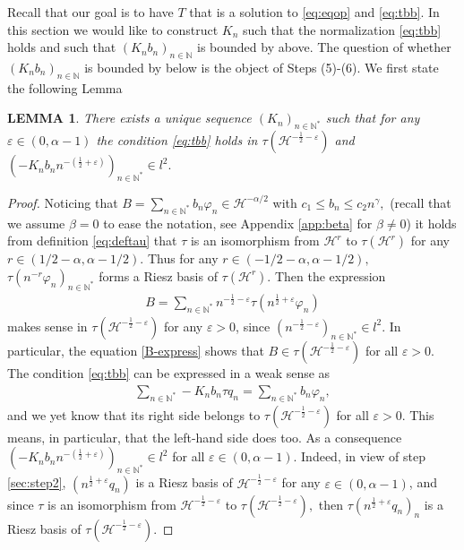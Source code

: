 \documentclass[11pt, dvipsnames]{amsart}
\newtheorem{lem}[theorem]{LEMMA}
\begin{document}
{ Recall that our goal is to have $T$ that is a solution to \eqref{eq:eqop} and \eqref{eq:tbb}. In this section 
we would like to construct $K_n$ such that the normalization \eqref{eq:tbb} holds and such that $(K_{n}b_n)_{n\in\mathbb{N}}$ is bounded by above. The question of whether $(K_{n} b_n)_{n\in\mathbb{N}}$ is bounded by below is the object of Steps (5)-(6). We first state the following Lemma
\begin{lem}\label{lem:regk}
 There exists a unique sequence $(K_n)_{n\in{\mathbb{N}^*}}$ such that for any $\varepsilon \in (0,\alpha-1)$ the condition \eqref{eq:tbb} holds in $\tau(\mathcal{H}^{-\frac{1}{2}-\varepsilon})$ and $(-K_n b_n n^{-(\frac{1}{2}+\varepsilon)})_{n\in\mathbb{N}^*}\in l^2.$   
\end{lem}
\begin{proof}
    Noticing that $B=\sum_{n\in \mathbb{N}^*}b_n\varphi_n\in \mathcal{H}^{-\alpha/2}$ with $c_1\leq b_n\leq c_2 n^{\gamma},$ (recall that we assume $\beta=0$ to ease the notation, see Appendix \ref{app:beta} for $\beta\neq 0$)
    it holds from definition \eqref{eq:deftau} that $\tau$ is an isomorphism from $\mathcal{H}^r$ to $\tau(\mathcal{H}^r)$ for any $r\in (1/2-\alpha,\alpha-1/2).$ Thus for any $r\in (-1/2-\alpha,\alpha-1/2),$ $\tau (n^{-r}\varphi_n)_{n\in \mathbb{N}^*}$ forms a Riesz basis of $\tau(\mathcal{H}^r).$  Then the expression 
    \begin{align}
        B=\displaystyle\sum_{n\in \mathbb{N}^*} n^{-\frac{1}{2}-\varepsilon}\tau(n^{\frac{1}{2}+\varepsilon}\varphi_n) \label{B-express}
    \end{align} makes sense in $\tau(\mathcal{H}^{-\frac{1}{2}-\varepsilon})$  for any $\varepsilon>0$, since $\left(n^{-\frac{1}{2}-\varepsilon}\right)_{n\in \mathbb{N}^*}\in l^2$. In particular, the equation \eqref{B-express} shows that $B\in \tau(\mathcal{H}^{-\frac{1}{2}-\varepsilon})$ for all $\varepsilon>0$. 
    The condition \eqref{eq:tbb} can be expressed in a weak sense as
    \begin{align}
   \sum_{n\in \mathbb{N}^*}-K_n b_n \tau q_n=\sum_{n\in \mathbb{N}^*}b_n \varphi_n,\label{TB=B-expression}
\end{align}  and we yet know that its right side belongs to $\tau(\mathcal{H}^{-\frac{1}{2}-\varepsilon})$ for all $\varepsilon>0$. This means, in particular, that the left-hand side does too. As a consequence $(-K_n b_n n^{-(\frac{1}{2}+\varepsilon)})_{n\in \mathbb{N}^*}\in l^2$ for all $\varepsilon \in (0,\alpha-1)$.
Indeed, in view of step \ref{sec:step2}, $(n^{\frac{1}{2}+\varepsilon}q_n)$ is a Riesz basis of $\mathcal{H}^{-\frac{1}{2}-\varepsilon}$ for any $\varepsilon \in (0,\alpha-1)$, and since $\tau$ is an isomorphism from $\mathcal{H}^{-\frac{1}{2}-\varepsilon}$ to $\tau(\mathcal{H}^{-\frac{1}{2}-\varepsilon}),$ then $\tau(n^{\frac{1}{2}+\varepsilon} q_n)_n$ is a Riesz basis of $\tau(\mathcal{H}^{-\frac{1}{2}-\varepsilon})$.
\end{proof}
}
\end{document}
